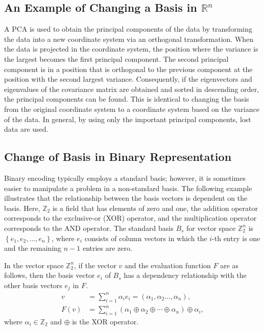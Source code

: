 \subsection{An Example of Changing a Basis in \boldmath$\mathbb{R}^n$}
A PCA is used to obtain the principal components of the data by transforming the data into a new coordinate system via an orthogonal transformation. When the data is projected in the coordinate system, the position where the variance is the largest becomes the first principal component. The second principal component is in a position that is orthogonal to the previous component at the position with the second largest variance. Consequently, if the eigenvectors and eigenvalues of the covariance matrix are obtained and sorted in descending order, the principal components can be found. This is identical to changing the basis from the original coordinate system to a coordinate system based on the variance of the data. In general, by using only the important principal components, lost data are used. 
%

\subsection{Change of Basis in Binary Representation} \label{sec22:cob}
Binary encoding typically employs a standard basis; however, it is sometimes easier to manipulate a problem in a non-standard basis. The following example illustrates that the relationship between the basis vectors is dependent on the basis. Here, $ \mathbb{Z}_2 $ is a field that has elements of zero and one, the addition operator corresponds to the exclusive-or (XOR) operator, and the multiplication operator corresponds to the AND operator. The standard basis $ B_s $ for vector space $ \mathbb{Z}_2^n $ is $ \left\{e_1,e_2,\ldots,e_n\right\} $, where $ e_i $ consists of column vectors in which the $ i $-th entry is one and the remaining $ n-1 $ entries are zero.

In the vector space $ \mathbb{Z}_2^n $, if the vector $ v $ and the evaluation function $ F $ are as follows, then the basis vector $ e_i $ of $ B_s $ has a dependency relationship with the other basis vectors $ e_j $ in $ F $.
\begin{align*}
v&=\sum_{i=1}^{n}{\alpha_ie_i}=\left(\alpha_1,\alpha_2\ldots,\alpha_n\right), \\
F\left(v\right)&=\sum_{i=1}^{n}{\left(\alpha_1\oplus\alpha_2\oplus\cdots\oplus\alpha_n\right)\oplus\alpha_i},
\end{align*}
where $ \alpha_i\in\mathbb{Z}_2 $ and $ \oplus $ is the XOR operator.

